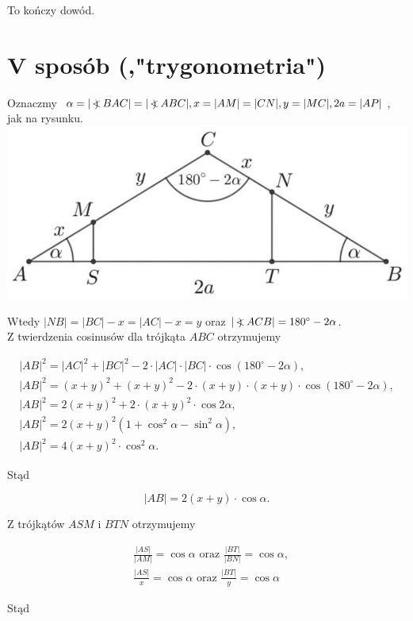 \documentclass[10pt]{article}
\newcommand\Varangle{\mathop{{<\!\!\!\!\!\text{\small)}}\:}\nolimits}
\begin{document}
To kończy dowód.

\section*{V sposób (,"trygonometria")}
Oznaczmy $\alpha=|\Varangle B A C|=|\Varangle A B C|, x=|A M|=|C N|, y=|M C|, 2 a=|A P|$, jak na rysunku.\\
\includegraphics[max width=\textwidth, center]{2025_02_07_d712b9a47aa2c64928dbg-19(1)}

Wtedy $|N B|=|B C|-x=|A C|-x=y$ oraz $|\Varangle A C B|=180^{\circ}-2 \alpha$.\\
Z twierdzenia cosinusów dla trójkąta $A B C$ otrzymujemy

$$
\begin{gathered}
|A B|^{2}=|A C|^{2}+|B C|^{2}-2 \cdot|A C| \cdot|B C| \cdot \cos \left(180^{\circ}-2 \alpha\right), \\
|A B|^{2}=(x+y)^{2}+(x+y)^{2}-2 \cdot(x+y) \cdot(x+y) \cdot \cos \left(180^{\circ}-2 \alpha\right), \\
|A B|^{2}=2(x+y)^{2}+2 \cdot(x+y)^{2} \cdot \cos 2 \alpha, \\
|A B|^{2}=2(x+y)^{2}\left(1+\cos ^{2} \alpha-\sin ^{2} \alpha\right), \\
|A B|^{2}=4(x+y)^{2} \cdot \cos ^{2} \alpha .
\end{gathered}
$$

Stąd

$$
|A B|=2(x+y) \cdot \cos \alpha .
$$

Z trójkątów $A S M$ i $B T N$ otrzymujemy

$$
\begin{aligned}
& \frac{|A S|}{|A M|}=\cos \alpha \text { oraz } \frac{|B T|}{|B N|}=\cos \alpha, \\
& \frac{|A S|}{x}=\cos \alpha \text { oraz } \frac{|B T|}{y}=\cos \alpha
\end{aligned}
$$

Stąd
\end{document}
